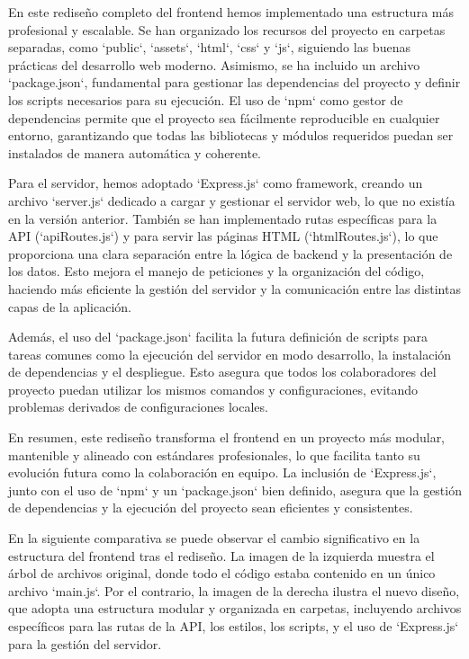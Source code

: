 \documentclass[a4paper, 12pt]{book}
\begin{document}
En este rediseño completo del frontend hemos implementado una estructura más profesional y escalable. Se han organizado los recursos del proyecto en carpetas separadas, como `public`, `assets`, `html`, `css` y `js`, siguiendo las buenas prácticas del desarrollo web moderno. Asimismo, se ha incluido un archivo `package.json`, fundamental para gestionar las dependencias del proyecto y definir los scripts necesarios para su ejecución. El uso de `npm` como gestor de dependencias permite que el proyecto sea fácilmente reproducible en cualquier entorno, garantizando que todas las bibliotecas y módulos requeridos puedan ser instalados de manera automática y coherente.

Para el servidor, hemos adoptado `Express.js` como framework, creando un archivo `server.js` dedicado a cargar y gestionar el servidor web, lo que no existía en la versión anterior. También se han implementado rutas específicas para la API (`apiRoutes.js`) y para servir las páginas HTML (`htmlRoutes.js`), lo que proporciona una clara separación entre la lógica de backend y la presentación de los datos. Esto mejora el manejo de peticiones y la organización del código, haciendo más eficiente la gestión del servidor y la comunicación entre las distintas capas de la aplicación.

Además, el uso del `package.json` facilita la futura definición de scripts para tareas comunes como la ejecución del servidor en modo desarrollo, la instalación de dependencias y el despliegue. Esto asegura que todos los colaboradores del proyecto puedan utilizar los mismos comandos y configuraciones, evitando problemas derivados de configuraciones locales.

En resumen, este rediseño transforma el frontend en un proyecto más modular, mantenible y alineado con estándares profesionales, lo que facilita tanto su evolución futura como la colaboración en equipo. La inclusión de `Express.js`, junto con el uso de `npm` y un `package.json` bien definido, asegura que la gestión de dependencias y la ejecución del proyecto sean eficientes y consistentes.

En la siguiente comparativa se puede observar el cambio significativo en la estructura del frontend tras el rediseño. La imagen de la izquierda muestra el árbol de archivos original, donde todo el código estaba contenido en un único archivo `main.js`. Por el contrario, la imagen de la derecha ilustra el nuevo diseño, que adopta una estructura modular y organizada en carpetas, incluyendo archivos específicos para las rutas de la API, los estilos, los scripts, y el uso de `Express.js` para la gestión del servidor.
\end{document}
